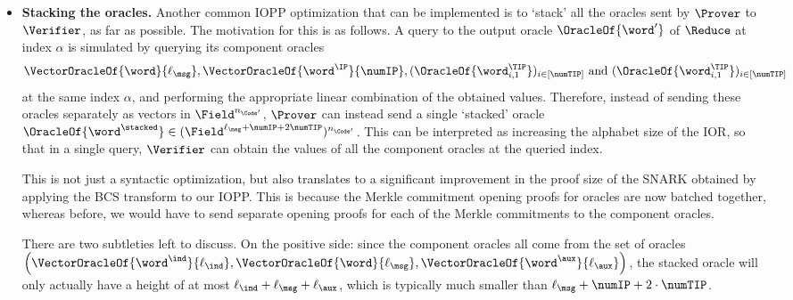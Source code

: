\begin{itemize}
    \item \textbf{Stacking the oracles. } 
    Another common IOPP optimization that can be implemented is to `stack' all the oracles sent by $\Prover$ to $\Verifier$, as far as possible.
    The motivation for this is as follows. A query to the output oracle $\OracleOf{\word'}$ of $\Reduce$ at index $\alpha$ is simulated by querying its component oracles
    \[
        \VectorOracleOf{\word}{\ell_{\msg}}, \VectorOracleOf{\word^{\IP}}{\numIP}, (\OracleOf{\word^{\TIP}_{i,1}})_{i \in [\numTIP]} \text{ and } (\OracleOf{\word^{\TIP}_{i,1}})_{i \in [\numTIP]}
    \] 
    at the same index $\alpha$, and performing the appropriate linear combination of the obtained values.
    Therefore, instead of sending these oracles separately as vectors in $\Field^{n_{\Code'}}$, $\Prover$ can instead send a single `stacked' oracle $\OracleOf{\word^{\stacked}} \in (\Field^{\ell_{\msg} + \numIP + 2\numTIP})^{n_{\Code'}}$. This can be interpreted as increasing the alphabet size of the IOR, so that in a single query, $\Verifier$ can obtain the values of all the component oracles at the queried index.

    This is not just a syntactic optimization, but also translates to a significant improvement in the proof size of the SNARK obtained by applying the BCS transform to our IOPP.
    This is because the Merkle commitment opening proofs for oracles are now batched together, whereas before, we would have to send separate opening proofs for each of the Merkle commitments to the component oracles.

    There are two subtleties left to discuss. 
    On the positive side: since the component oracles all come from the set of oracles $\left ( \VectorOracleOf{\word^{\ind}}{\ell_{\ind}}, \VectorOracleOf{\word}{\ell_{\msg}}, \VectorOracleOf{\word^{\aux}}{\ell_{\aux}} \right )$, the stacked oracle will only actually have a height of at most $\ell_{\ind} + \ell_{\msg} + \ell_{\aux}$, which is typically much smaller than $\ell_{\msg} + \numIP + 2 \cdot \numTIP$.


\end{itemize}

